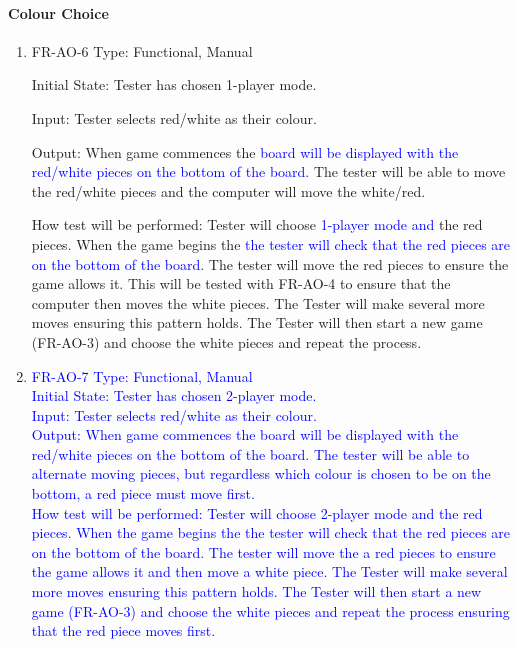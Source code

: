 \documentclass[12pt, titlepage]{article}
\begin{document}
\paragraph{Colour Choice}
\begin{enumerate}
    \item{FR-AO-6}
    Type: Functional, Manual
    
    Initial State: 
    Tester has chosen 1-player mode.
    					
    Input: Tester selects red/white as their colour.
    					
    Output: 
    When game commences the \textcolor{blue}{board will be displayed with the red/white pieces on the bottom of the board}. The tester will be able to move the red/white pieces and the computer will move the white/red.
				
    How test will be performed: Tester will choose \textcolor{blue}{1-player mode and} the red pieces. When the game begins the \textcolor{blue}{the tester will check that the red pieces are on the bottom of the board}. The tester will move the red pieces to ensure the game allows it. This will be tested with FR-AO-4 to ensure that the computer then moves the white pieces. The Tester will make several more moves ensuring this pattern holds. The Tester will then start a new game (FR-AO-3) and choose the white pieces and repeat the process.
    
    \item{}
    \textcolor{blue}{FR-AO-7
    Type: Functional, Manual\\
    Initial State: 
    Tester has chosen 2-player mode.\\
    Input: Tester selects red/white as their colour.\\
    Output: 
    When game commences the board will be displayed with the red/white pieces on the bottom of the board. The tester will be able to alternate moving pieces, but regardless which colour is chosen to be on the bottom, a red piece must move first.\\
    How test will be performed: Tester will choose 2-player mode and the red pieces. When the game begins the the tester will check that the red pieces are on the bottom of the board. The tester will move the a red pieces to ensure the game allows it and then move a white piece. The Tester will make several more moves ensuring this pattern holds. The Tester will then start a new game (FR-AO-3) and choose the white pieces and repeat the process ensuring that the red piece moves first.}
    
\end{enumerate}
\end{document}
